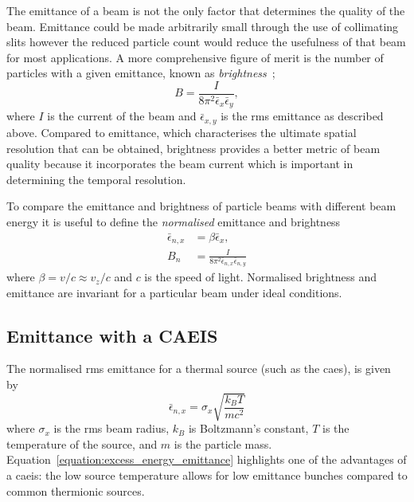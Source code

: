 The emittance of a beam is not the only factor that determines the quality of the beam.
Emittance could be made arbitrarily small through the use of collimating slits however the reduced particle count would reduce the usefulness of that beam for most applications.
A more comprehensive figure of merit is the number of particles with a given emittance, known as \emph{brightness}~\cite{reiser_theory_2008};
\begin{equation}
B = \frac{I}{8\pi^2\bar{\epsilon}_x\bar{\epsilon}_y},
\end{equation}
where $I$ is the current of the beam and $\bar{\epsilon}_{x,y}$ is the \gls{rms} emittance as described above.
Compared to emittance, which characterises the ultimate spatial resolution that can be obtained, brightness provides a better metric of beam quality because it incorporates the beam current which is important in determining the temporal resolution.

To compare the emittance and brightness of particle beams with different beam energy it is useful to define the \emph{normalised} emittance and brightness
\begin{align}
\bar{\epsilon}_{n,x} &= \beta\bar{\epsilon}_x,\\
B_n &= \frac{I}{8\pi^2\bar{\epsilon}_{n,x}\bar{\epsilon}_{n,y}}
\end{align}
where $\beta=v/c\approx v_z/c$ and $c$ is the speed of light.
Normalised brightness and emittance are invariant for a particular beam under ideal conditions.

\subsection{Emittance with a CAEIS}
\label{section:excess_energy_emittance}

The normalised \gls{rms} emittance for a thermal source (such as the \gls{caes}), is given by~\cite{mcculloch_high-coherence_2013}
\begin{equation}\label{equation:excess_energy_emittance}
\bar{\epsilon}_{n,x} = \sigma_x \sqrt{\frac{k_B T}{m c^2}}
\end{equation}
where $\sigma_x$ is the \gls{rms} beam radius, $k_B$ is Boltzmann's constant, $T$ is the temperature of the source, and $m$ is the particle mass.
Equation~\ref{equation:excess_energy_emittance} highlights one of the advantages of a \gls{caeis}: the low source temperature allows for low emittance bunches compared to common thermionic sources.

